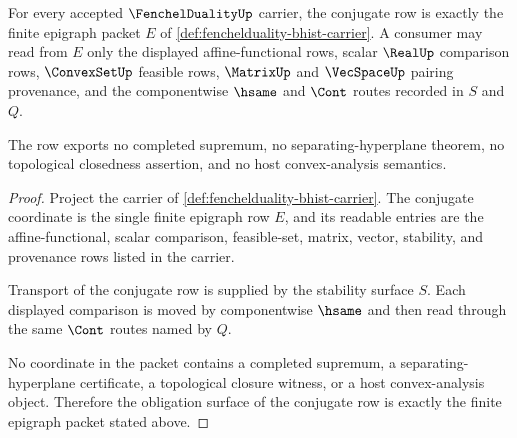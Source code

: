 \begin{theorem}
\label{thm:fenchelduality-conjugate-row-obligation}
For every accepted $\FenchelDualityUp$ carrier, the conjugate row is exactly the finite epigraph packet $E$ of \autoref{def:fenchelduality-bhist-carrier}. A consumer may read from $E$ only the displayed affine-functional rows, scalar $\RealUp$ comparison rows, $\ConvexSetUp$ feasible rows, $\MatrixUp$ and $\VecSpaceUp$ pairing provenance, and the componentwise $\hsame$ and $\Cont$ routes recorded in $S$ and $Q$.

The row exports no completed supremum, no separating-hyperplane theorem, no topological closedness assertion, and no host convex-analysis semantics.
\end{theorem}
\begin{proof}
Project the carrier of \autoref{def:fenchelduality-bhist-carrier}. The conjugate coordinate is the single finite epigraph row $E$, and its readable entries are the affine-functional, scalar comparison, feasible-set, matrix, vector, stability, and provenance rows listed in the carrier.

Transport of the conjugate row is supplied by the stability surface $S$. Each displayed comparison is moved by componentwise $\hsame$ and then read through the same $\Cont$ routes named by $Q$.

No coordinate in the packet contains a completed supremum, a separating-hyperplane certificate, a topological closure witness, or a host convex-analysis object. Therefore the obligation surface of the conjugate row is exactly the finite epigraph packet stated above.
\end{proof}

